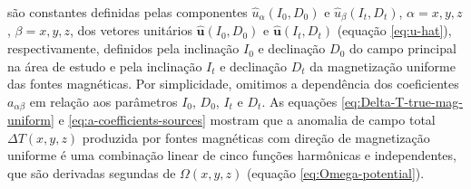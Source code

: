 são constantes definidas pelas componentes $\hat{u}_{\alpha}(I_{0}, D_{0})$ e $\hat{u}_{\beta}(I_{t}, D_{t})$, 
$\alpha = x, y, z$, $\beta = x, y, z$, dos vetores unitários $\hat{\mathbf{u}}(I_{0}, D_{0})$ e 
$\hat{\mathbf{u}}(I_{t}, D_{t})$ (equação \ref{eq:u-hat}), respectivamente,
definidos pela inclinação $I_{0}$ e declinação $D_{0}$ do campo principal na área de estudo e 
pela inclinação $I_{t}$ e declinação $D_{t}$ da magnetização uniforme das fontes magnéticas. 
Por simplicidade, omitimos a dependência dos coeficientes $a_{\alpha\beta}$ em relação aos parâmetros 
$I_{0}$, $D_{0}$, $I_{t}$ e $D_{t}$.
As equações \ref{eq:Delta-T-true-mag-uniform} e \ref{eq:a-coefficients-sources} mostram que a anomalia de campo 
total $\Delta T(x, y, z)$ produzida por fontes magnéticas com direção de magnetização uniforme é 
uma combinação linear de cinco funções harmônicas e independentes, que são derivadas segundas 
de $\Omega(x, y, z)$ (equação \ref{eq:Omega-potential}).

